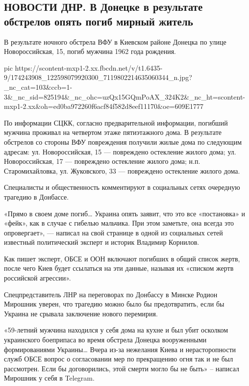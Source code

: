  
 
 
 
 

\subsection{НОВОСТИ ДНР. В Донецке в результате обстрелов опять погиб мирный житель}

В результате ночного обстрела ВФУ в Киевском районе Донецка по улице Новороссийская, 15, погиб мужчина 1962 года рождения.

\ifcmt
  pic https://scontent-mxp1-2.xx.fbcdn.net/v/t1.6435-9/174243908_122598079920300_7119802214635060344_n.jpg?_nc_cat=103&ccb=1-3&_nc_sid=825194&_nc_ohc=uzQx15GQmPoAX_324K2&_nc_ht=scontent-mxp1-2.xx&oh=ed0ba972260f6acf84f582d8eef11170&oe=609E1777
\fi

По информации СЦКК, согласно предварительной информации, погибший мужчина
проживал на четвертом этаже пятиэтажного дома. В результате обстрелов со
стороны ВФУ повреждения получили жилые дома по следующим адресам: ул.
Новороссийская, 15 — повреждено остекление жилого дома; ул. Новороссийская, 17
— повреждено остекление жилого дома; н.п. Старомихайловка, ул. Жуковского, 33 —
повреждено остекление жилого дома.

Специалисты и общественность комментируют в социальных сетях очередную трагедию в Донбассе.

«Прямо в своем доме погиб… Украина опять заявит, что это все «постановка» и
«фейк», как в случае с гибелью мальчика. При этом заметьте, она всегда это
опровергает», — написал на свой странице в одной из социальных сетей известный
политический эксперт и историк Владимир Корнилов.

Как пишет эксперт, ОБСЕ и ООН включают погибших в общий список жертв, после
чего Киев будет ссылаться на эти данные, называя их «списком жертв российской
агрессии».

Спецпредставитель ЛНР на переговорах по Донбассу в Минске Родион Мирошник
уверен, что трагедию можно было бы предотвратить, если бы Украина не срывала
заключение нового перемирия.

«59-летний мужчина находился у себя дома на кухне и был убит осколком
украинского боеприпаса во время обстрела Донецка вооруженными формированиями
Украины… Вчера из-за нежелания Киева и нерасторопности служб ОБСЕ вопрос о
согласовании мер по прекращению огня так и не был рассмотрен. Если бы
договорились, этой смерти могло бы не быть» – написал Мирошник у себя в
Telegram.
